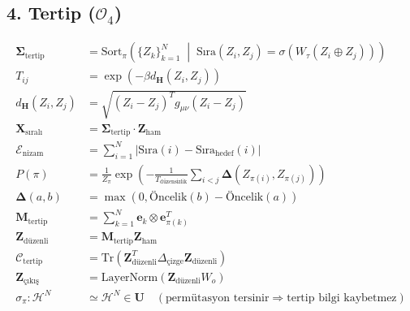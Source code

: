 \documentclass[11pt, a4paper]{article}
\begin{document}
\subsection{4. Tertip ($\mathcal{O}_4$)}
\begin{align}
\mathbf{\Sigma}_{\text{tertip}} &= \text{Sort}_{\pi} \left( \{Z_k\}_{k=1}^N \;\middle|\; \text{Sıra}(Z_i, Z_j) = \sigma(W_\tau (Z_i \oplus Z_j)) \right) \\
T_{ij} &= \exp\left( -\beta d_{\mathbf{H}}(Z_i, Z_j) \right) \\
d_{\mathbf{H}}(Z_i, Z_j) &= \sqrt{(Z_i - Z_j)^T g_{\mu\nu} (Z_i - Z_j)} \\
\mathbf{X}_{\text{sıralı}} &= \mathbf{\Sigma}_{\text{tertip}} \cdot \mathbf{Z}_{\text{ham}} \\
\mathcal{E}_{\text{nizam}} &= \sum_{i=1}^N |\text{Sıra}(i) - \text{Sıra}_{\text{hedef}}(i)| \\
P(\pi) &= \frac{1}{Z_\pi} \exp\left( -\frac{1}{T_{\text{düzensizlik}}} \sum_{i<j} \mathbf{\Delta}(Z_{\pi(i)}, Z_{\pi(j)}) \right) \\
\mathbf{\Delta}(a, b) &= \max\left( 0, \text{Öncelik}(b) - \text{Öncelik}(a) \right) \\
\mathbf{M}_{\text{tertip}} &= \sum_{k=1}^N \mathbf{e}_k \otimes \mathbf{e}_{\pi(k)}^T \\
\mathbf{Z}_{\text{düzenli}} &= \mathbf{M}_{\text{tertip}} \mathbf{Z}_{\text{ham}} \\
\mathcal{C}_{\text{tertip}} &= \text{Tr}(\mathbf{Z}_{\text{düzenli}}^T \Delta_{\text{çizge}} \mathbf{Z}_{\text{düzenli}}) \\
\mathbf{Z}_{\text{çıkış}} &= \text{LayerNorm}(\mathbf{Z}_{\text{düzenli}} W_o) \\
\sigma_\pi : \mathcal{H}^N &\simeq \mathcal{H}^N \in \mathbf{U} \quad (\text{permütasyon tersinir} \Rightarrow \text{tertip bilgi kaybetmez})
\end{align}
\end{document}

